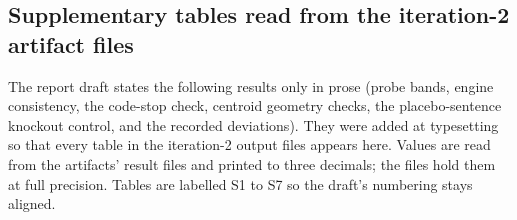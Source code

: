 \documentclass[11pt,letterpaper]{article}
\begin{document}
\subsection{Supplementary tables read from the iteration-2 artifact files}

The report draft states the following results only in prose (probe bands, engine consistency, the code-stop check, centroid geometry checks, the placebo-sentence knockout control, and the recorded deviations). They were added at typesetting so that every table in the iteration-2 output files appears here. Values are read from the artifacts' result files and printed to three decimals; the files hold them at full precision. Tables are labelled S1 to S7 so the draft's numbering stays aligned.

\begingroup\footnotesize\setlength{\tabcolsep}{3pt}\addtocounter{table}{-1}
\end{document}

